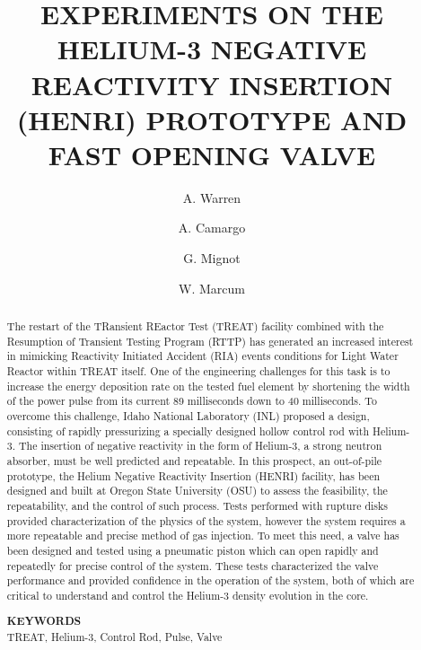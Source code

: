 \documentclass{anstopical-class/ansconf}
\begin{document}
\title{EXPERIMENTS ON THE HELIUM-3 NEGATIVE REACTIVITY INSERTION (HENRI) PROTOTYPE AND FAST OPENING VALVE}

\author{A. Warren}
\author{A. Camargo}
\author{G. Mignot}
\author{W. Marcum}


\maketitle

\begin{abstract}
The restart of the TRansient REactor Test (TREAT) facility combined with the Resumption of Transient Testing Program (RTTP) has generated an increased interest in mimicking Reactivity Initiated  Accident (RIA) events conditions for Light Water Reactor within TREAT itself. One of the engineering challenges for this task is to increase the energy deposition rate on the tested fuel element by shortening the width of the  power  pulse  from  its  current  89  milliseconds down  to  40 milliseconds. To overcome  this  challenge, Idaho National Laboratory (INL) proposed a design, consisting of rapidly pressurizing a specially designed hollow control rod with Helium-3. The insertion of negative reactivity in the form of Helium-3, a strong neutron  absorber,  must  be  well  predicted and repeatable.  In  this  prospect,  an  out-of-pile  prototype,  the Helium  Negative  Reactivity  Insertion  (HENRI) facility, has been designed  and  built  at  Oregon  State University (OSU) to  assess  the  feasibility,  the  repeatability, and  the control of such process. Tests performed with rupture disks provided characterization of the physics of the system, however the system requires a more repeatable and precise method of gas injection. To meet this need, a valve has been designed and tested using a pneumatic piston which can open rapidly and repeatedly for precise control of the system. These tests characterized the valve performance and provided confidence in the operation of the system, both of which are critical to understand and control the Helium-3 density evolution in the core.

\raggedleft
\textbf{KEYWORDS}\\
TREAT, Helium-3, Control Rod, Pulse, Valve
\end{abstract}
\end{document}
